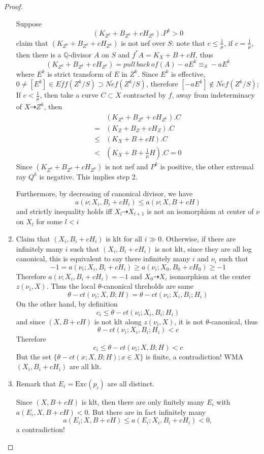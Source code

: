\documentclass{article}
\begin{document}
\begin{proof}
\begin{enumerate}[Step 1]
Suppose
$$ (K_{Z^k}+B_{Z^k}+cH_{Z^k}).P^k>0 $$
claim that $ (K_{Z^k}+B_{Z^k}+cH_{Z^k}) $ is not nef over $ S $: note that $ c\leqslant \frac{1}{\mu} $, if $ c=\frac{1}{\mu} $, then there is a $ \mathbb{Q} $-divisor $ A $ on $ S $ and $ f^*A=K_X+B+cH $, thus 
$$ (K_{Z^k}+B_{Z^k}+cH_{Z^k})=pull\,back\,of (A)-aE^k\equiv_S -aE^k $$
where $ E^k $ is strict transform of $ E $ in $ Z^k $. Since $ E^k $ is effective, $ 0\neq [E^k]\in \overline{Eff}(Z^k/S)\supset \overline{Nef}(Z^k/S) $, therefore $ [-aE^k]\notin \overline{Nef}(Z^k/S) $; If $ c<\frac{1}{\mu} $, then take a curve $ C\subset X $ contracted by $ f $, away from indeterminacy of $ X\dashrightarrow Z^k $, then
\begin{equation*}
\begin{aligned}
&(K_{Z^k}+B_{Z^k}+cH_{Z^k}).C\\
=&   (K_{Z}+B_{Z}+cH_{Z}).C\\
\leqslant& (K_{X}+B+cH).C\\
<&(K_X+B+\frac{1}{\mu}H).C=0
\end{aligned}
\end{equation*} 
Since $ (K_{Z^k}+B_{Z^k}+cH_{Z^k}) $ is not nef and $ P^k $ is positive, the other extremal ray $ Q^k $ is negative. This implies step 2. 

Furthermore, by decreasing of canonical divisor, we have
$$ a(\nu;X_i,B_i+cH_i)\leqslant a(\nu;X,B+cH) $$
and strictly inequality holds iff $ X_l\dashrightarrow X_{l+1} $ is not an isomorphism at center of $ \nu $ on $ X_l $ for some $ l<i $
\item Claim that $ (X_i,B_i+cH_i) $ is klt for all $ i\gg 0 $. Otherwise, if there are infinitely many $ i $ such that $ (X_i,B_i+cH_i) $ is not klt, since they are all log canonical, this is equivalent to say there infinitely many $ i $ and $ \nu_i $ such that
$$ -1=a(\nu_i;X_i,B_i+cH_i)\geqslant a(\nu_i;X_0,B_0+cH_0)\geqslant -1  $$
Therefore $ a(\nu;X_i,B_i+cH_i)=-1 $ and $ X_0\dashrightarrow X_i $ isomorphism at the center $ z(\nu_i,X) $. Thus the local $ \theta $-canonical threholds are same
$$ \theta-ct(\nu_i;X,B;H)=\theta-ct(\nu_i;X_i,B_i;H_i) $$
On the other hand, by definition
$$ c_i \leqslant \theta-ct(\nu_i;X_i,B_i;H_i) $$
and since $ (X,B+cH) $ is not klt along $ z(\nu_i,X) $, it is not $ \theta $-canonical, thus
$$ \theta-ct(\nu_i;X_i,B_i;H_i)<c $$
Therefore
$$ c_i\leqslant \theta-ct(\nu_i;X,B;H)<c $$
But the set $\{ \theta-ct(x;X,B;H);x\in X\} $ is finite, a contradiction! WMA $ (X_i,B_i+cH_i) $ are all klt.
\item Remark that $ E_i=\mathrm{Exc}(p_i) $ are all distinct.

Since $ (X,B+cH) $ is klt, then there are only finitely many $ E_i $ with $ a(E_i,X,B+cH)<0 $. But there are in fact infinitely many
$$ a(E_i;X,B+cH)\leqslant  a(E_i;X_i,B_i+cH_i)<0 ,$$ 
a contradiction! 
\end{enumerate}
\end{proof}
\end{document}

